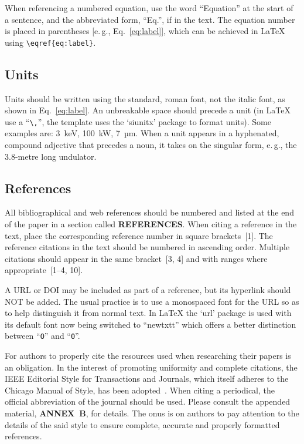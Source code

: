 \documentclass[a4paper,
               keeplastbox,   %
               ]{jacow}
\begin{document}
When referencing a numbered equation, use the word
“Equation” at the start of a sentence, and the abbreviated
form, “Eq.”, if in the text. The equation number is placed
in parentheses [e.\,g., Eq.~\eqref{eq:label}], which can be 
achieved in \LaTeX{} using \verb|\eqref{eq:label}|.

\subsection{Units}
	
Units should be written using the standard, roman font,
not the italic font, as shown in Eq.~\eqref{eq:label}.
An unbreakable space should precede a unit (in \LaTeX{} use a “\verb|\,|”,
the template uses the ‘siunitx’ package to format units).
Some examples are: \SI{3}{keV},
\SI{100}{kW}, \SI{7}{µm}. When a unit appears in a hyphenated,
compound adjective that precedes a noun, it takes on the
singular form, e.\,g., the 3.8-metre long undulator.

\subsection{References}
%
%
All bibliographical and web references should be numbered and listed at the
end of the paper in a section called \textbf{REFERENCES}. When citing a
reference in the text, place the corresponding reference number in square
brackets~[1]. The reference citations in the text should be numbered
in ascending order. Multiple citations should appear in
the same bracket~[3, 4] and
with ranges where appropriate~[1--4, 10].

A URL or DOI may be included as part of a reference, but its
hyperlink should NOT be added. The usual practice is to
use a monospaced font for the URL so as to help distinguish
it from normal text. In \LaTeX{} the ‘url’ package is used with its 
default font now being switched to ``newtxtt'' which offers
a better distinction between ``\texttt{O}'' and ``\texttt{0}''.

For authors to properly cite the resources used when researching
their papers is an obligation. In the interest of
promoting uniformity and complete citations, the IEEE
Editorial Style for Transactions and Journals, which itself 
adheres to the Chicago Manual of Style, has been adopted~\cite{IEEE}. 
When citing a periodical, the official abbreviation of the journal 
should be used\cite{journal-abbreviations}.
Please consult the appended material, \textbf{ANNEX~B},
for details. The onus is on authors to pay attention to
the details of the said style to ensure complete, accurate
and properly formatted references.
\end{document}
